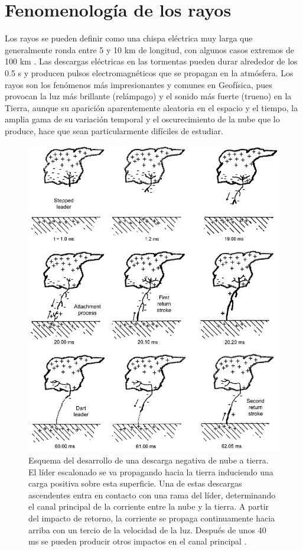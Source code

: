 \documentclass[12pt,oneside,openany,letter]{book}
\begin{document}
\section{Fenomenología de los rayos}\label{fenomenologia}
Los rayos se pueden definir como una chispa eléctrica muy larga que generalmente ronda entre 5 y 10 km de longitud, con algunos casos extremos de 100 km \cite{DwyerUman2014}. Las descargas eléctricas en las tormentas pueden durar alrededor de los 0.5 s y producen pulsos electromagnéticos que se propagan en la atmósfera. Los rayos son los fenómenos más impresionantes y comunes en Geofísica, pues provocan la luz más brillante (relámpago) y el sonido más fuerte (trueno) en la Tierra, aunque su aparición aparentemente aleatoria en el espacio y el tiempo, la amplia gama de su variación temporal y el oscurecimiento de la nube que lo produce, hace que sean particularmente difíciles de estudiar.

\begin{figure}
    \centering
    \includegraphics[scale=0.5]{cg_development.png}
    \caption[Desarrollo de una descarga negativa de nube a tierra]{Esquema del desarrollo de una descarga negativa de nube a tierra. El l\'ider escalonado se va propagando hacia la tierra induciendo una carga positiva sobre esta superficie. Una de estas descargas ascendentes entra en contacto con una rama del líder, determinando el canal principal de la corriente entre la nube y la tierra. A partir del impacto de retorno, la corriente se propaga continuamente hacia arriba con un tercio de la velocidad de la luz. Después de unos 40 ms se pueden producir otros impactos en el canal principal \cite{DwyerUman2014}.}
    \label{fig:cg_development}
\end{figure}
\end{document}
